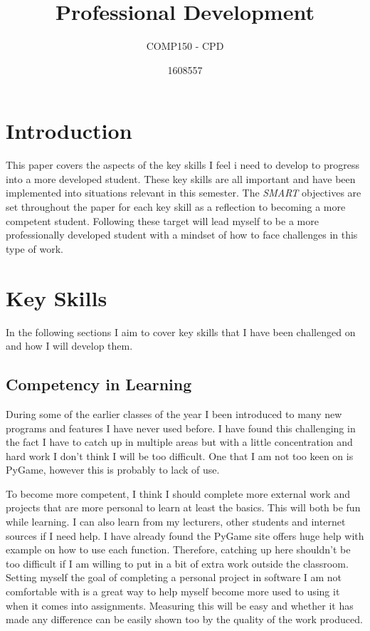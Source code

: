 \documentclass{scrartcl}
\title{Professional Development}
\subtitle{COMP150 - CPD}
\author{1608557}
\begin{document}
\maketitle
\section{Introduction}
This paper covers the aspects of the key skills I feel i need to develop to progress into a more developed student. These key skills are all important and have been implemented into situations relevant in this semester. The \textit{SMART} objectives are set throughout the paper for each key skill as a reflection to becoming a more competent student. Following these target will lead myself to be a more professionally developed student with a mindset of how to face challenges in this type of work.

\section{Key Skills}
In the following sections I aim to cover key skills that I have been challenged on and how I will develop them. 

\subsection{Competency in Learning}
During some of the earlier classes of the year I been introduced to many new programs and features I have never used before. I have found this challenging in the fact I have to catch up in multiple areas but with a little concentration and hard work I don’t think I will be too difficult. One that I am not too keen on is PyGame, however this is probably to lack of use.

To become more competent, I think I should complete more external work and projects that are more personal to learn at least the basics. This will both be fun while learning. I can also learn from my lecturers, other students and internet sources if I need help. I have already found the PyGame site offers huge help with example on how to use each function. Therefore, catching up here shouldn’t be too difficult if I am willing to put in a bit of extra work outside the classroom. Setting myself the goal of completing a personal project in software I am not comfortable with is a great way to help myself become more used to using it when it comes into assignments. Measuring this will be easy and whether it has made any difference can be easily shown too by the quality of the work produced.
\end{document}
